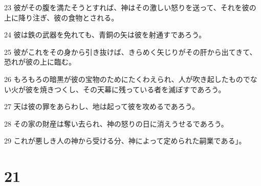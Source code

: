 \par 23 彼がその腹を満たそうとすれば、神はその激しい怒りを送って、それを彼の上に降り注ぎ、彼の食物とされる。
\par 24 彼は鉄の武器を免れても、青銅の矢は彼を射通すであろう。
\par 25 彼がこれをその身から引き抜けば、きらめく矢じりがその肝から出てきて、恐れが彼の上に臨む。
\par 26 もろもろの暗黒が彼の宝物のためにたくわえられ、人が吹き起したものでない火が彼を焼きつくし、その天幕に残っている者を滅ぼすであろう。
\par 27 天は彼の罪をあらわし、地は起って彼を攻めるであろう。
\par 28 その家の財産は奪い去られ、神の怒りの日に消えうせるであろう。
\par 29 これが悪しき人の神から受ける分、神によって定められた嗣業である」。

\chapter{21}

